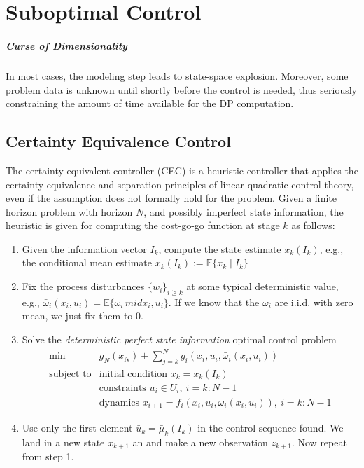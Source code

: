 \chapter{Suboptimal Control}

\paragraph{Curse of Dimensionality}
In most cases, the modeling step leads to state-space explosion.
Moreover, some problem data is unknown until shortly before the control is needed, thus seriously constraining the amount of time available for the DP computation.

\section{Certainty Equivalence Control}
The certainty equivalent controller (CEC) is a heuristic controller that applies the 
certainty equivalence and separation principles of linear quadratic control theory,
even if the assumption does not formally hold for the problem.
Given a finite horizon problem with horizon $N$, and possibly imperfect state information,
the heuristic is given for computing the cost-go-go function at stage $k$ as follows:
\begin{enumerate}
\item
Given the information vector $I_k$, compute the state estimate 
$\bar{x}_k(I_k)$, e.g., the conditional mean estimate $\bar{x}_k(I_k):=\mathbb{E}\{x_k\mid I_k\}$
\item
Fix the process disturbances $\{w_i\}_{i\ge k}$ at some typical deterministic value, e.g.,
$\bar{\omega}_i(x_i,u_i) = \mathbb{E}\{\omega_i\,mid x_i,u_i\}$.
If we know that the $\omega_i$ are i.i.d. with zero mean, we just fix them to $0$.
\item
Solve the \emph{deterministic perfect state information} optimal control problem
\[
\begin{array}{ll}
\min&g_N(x_N)+\sum_{j=k}^Ng_i(x_i,u_i,\bar{\omega}_i(x_i,u_i))\\
\text{subject to}&\text{initial condition }x_k=\bar{x}_k(I_k)\\
&\text{constraints }u_i\in U_i,\ i=k:N-1\\
&\text{dynamics } x_{i+1}=f_i(x_i,u_i,\bar{\omega}_i(x_i,u_i)),\ i=k:N-1
\end{array}
\]
\item
Use only the first element $\bar{u}_k=\bar{\mu}_k(I_k)$ in the control sequence found.
We land in a new state $x_{k+1}$ an and make a new observation $z_{k+1}$.
Now repeat from step 1.
\end{enumerate}

